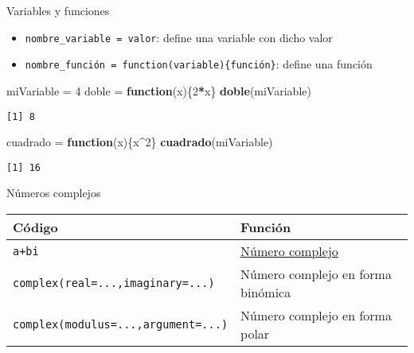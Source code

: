 \documentclass[
  ignorenonframetext,
]{beamer}
\newenvironment{Shaded}{\begin{snugshade}}{\end{snugshade}}
\newcommand{\ControlFlowTok}[1]{\textcolor[rgb]{0.13,0.29,0.53}{\textbf{#1}}}
\newcommand{\DecValTok}[1]{\textcolor[rgb]{0.00,0.00,0.81}{#1}}
\newcommand{\KeywordTok}[1]{\textcolor[rgb]{0.13,0.29,0.53}{\textbf{#1}}}
\newcommand{\NormalTok}[1]{#1}
\newcommand{\OperatorTok}[1]{\textcolor[rgb]{0.81,0.36,0.00}{\textbf{#1}}}
\newcommand{\StringTok}[1]{\textcolor[rgb]{0.31,0.60,0.02}{#1}}
\providecommand{\tightlist}{%
  \setlength{\itemsep}{0pt}\setlength{\parskip}{0pt}}
\begin{document}
\begin{frame}[fragile]{Variables y funciones}
\protect\hypertarget{variables-y-funciones}{}

\begin{itemize}
\tightlist
\item
  \texttt{nombre\_variable\ =\ valor}: define una variable con dicho
  valor
\item
  \texttt{nombre\_función\ =\ function(variable)\{función\}}: define una
  función
\end{itemize}

\begin{Shaded}
\begin{Highlighting}[]
\NormalTok{miVariable =}\StringTok{ }\DecValTok{4}
\NormalTok{doble =}\StringTok{ }\ControlFlowTok{function}\NormalTok{(x)\{}\DecValTok{2}\OperatorTok{*}\NormalTok{x\}}
\KeywordTok{doble}\NormalTok{(miVariable)}
\end{Highlighting}
\end{Shaded}

\begin{verbatim}
[1] 8
\end{verbatim}

\begin{Shaded}
\begin{Highlighting}[]
\NormalTok{cuadrado =}\StringTok{ }\ControlFlowTok{function}\NormalTok{(x)\{x}\OperatorTok{^}\DecValTok{2}\NormalTok{\}}
\KeywordTok{cuadrado}\NormalTok{(miVariable)}
\end{Highlighting}
\end{Shaded}

\begin{verbatim}
[1] 16
\end{verbatim}

\end{frame}

\begin{frame}[fragile]{Números complejos}
\protect\hypertarget{nuxfameros-complejos}{}

\begin{longtable}[]{@{}ll@{}}
\toprule
Código & Función\tabularnewline
\midrule
\endhead
\texttt{a+bi} &
\href{https://es.wikipedia.org/wiki/Número_complejo}{Número
complejo}\tabularnewline
\texttt{complex(real=...,imaginary=...)} & Número complejo en forma
binómica\tabularnewline
\texttt{complex(modulus=...,argument=...)} & Número complejo en forma
polar\tabularnewline
\bottomrule
\end{longtable}

\end{frame}
\end{document}
